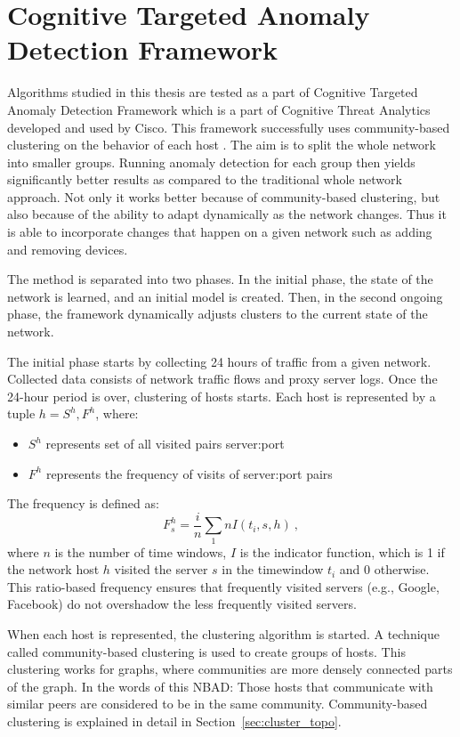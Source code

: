 \documentclass[thesis=B,english]{FITthesis}[2012/10/20]
\begin{document}
\section{Cognitive Targeted Anomaly Detection Framework}\label{sec:ctadf}

Algorithms studied in this thesis are tested as a part of Cognitive Targeted Anomaly Detection Framework which is a part of Cognitive Threat Analytics developed and used by Cisco.
This framework successfully uses community-based clustering on the behavior of each host \cite{kopp2018community}.
The aim is to split the whole network into smaller groups.
Running anomaly detection for each group then yields significantly better results as compared to the traditional whole network approach.
Not only it works better because of community-based clustering, but also because of the ability to adapt dynamically as the network changes.
Thus it is able to incorporate changes that happen on a given network such as adding and removing devices.

The method is separated into two phases.
In the initial phase, the state of the network is learned, and an initial model is created.
Then, in the second ongoing phase, the framework dynamically adjusts clusters to the current state of the network.

The initial phase starts by collecting 24 hours of traffic from a given network.
Collected data consists of network traffic flows and proxy server logs.
Once the 24-hour period is over, clustering of hosts starts.
Each host is represented by a tuple $h = {S^h, F^h}$, where:
\begin{itemize}
    \item $S^h$ represents set of all visited pairs server:port
    \item $F^h$ represents the frequency of visits of server:port pairs
\end{itemize}
The frequency is defined as:
\begin{equation}
F_s^h = \frac{i}{n}\sum\limits_{1}{n}I(t_i, s, h)\:,
\end{equation}
where $n$ is the number of time windows, $I$ is the indicator function, which is 1 if the network host $h$ visited the server $s$ in the timewindow $t_i$ and 0 otherwise.
This ratio-based frequency ensures that frequently visited servers (e.g., Google, Facebook) do not overshadow the less frequently visited servers.

When each host is represented, the clustering algorithm is started.
A technique called community-based clustering is used to create groups of hosts.
This clustering works for graphs, where communities are more densely connected parts of the graph.
In the words of this NBAD: Those hosts that communicate with similar peers are considered to be in the same community.
Community-based clustering is explained in detail in Section~\ref{sec:cluster_topo}.
\end{document}
